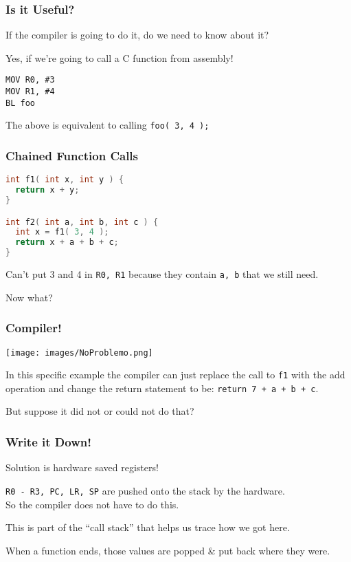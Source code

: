 \begin{frame}[fragile]
\frametitle{Is it Useful?}

If the compiler is going to do it, do we need to know about it?

Yes, if we're going to call a C function from assembly!

\begin{verbatim}
MOV R0, #3
MOV R1, #4
BL foo
\end{verbatim}

The above is equivalent to calling \texttt{foo( 3, 4 );}

\end{frame}


\begin{frame}[fragile]
\frametitle{Chained Function Calls}

\begin{lstlisting}[language=C]
int f1( int x, int y ) {
  return x + y;
}

int f2( int a, int b, int c ) {
  int x = f1( 3, 4 );
  return x + a + b + c;
}
\end{lstlisting}


Can't put 3 and 4 in \texttt{R0, R1} because they contain \texttt{a, b} that we still need.

Now what? 

\end{frame}


\begin{frame}
\frametitle{Compiler!}

\begin{center}
	\texttt{[image: images/NoProblemo.png]}
\end{center}

In this specific example the compiler can just replace the call to \texttt{f1} with the add operation and change the return statement to be: \texttt{return 7 + a + b + c}.

But suppose it did not or could not do that?

\end{frame}


\begin{frame}
\frametitle{Write it Down!}

Solution is hardware saved registers!

\texttt{R0 - R3, PC, LR, SP} are pushed onto the stack by the hardware.\\
\quad So the compiler does not have to do this.

This is part of the ``call stack'' that helps us trace how we got here.

When a function ends, those values are popped \& put back where they were.
\end{frame}


